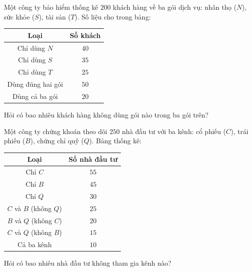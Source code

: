 \begin{bt}%
	Một công ty bảo hiểm thống kê $200$ khách hàng về ba gói dịch vụ: nhân thọ ($N$), sức khỏe ($S$), tài sản ($T$). Số liệu cho trong bảng:
	\begin{center}
		\begin{tabular}{|c|c|}
			\hline
			Loại & Số khách \\
			\hline
			Chỉ dùng $N$ & $40$ \\
			Chỉ dùng $S$ & $35$ \\
			Chỉ dùng $T$ & $25$ \\
			Dùng đúng hai gói & $50$ \\
			Dùng cả ba gói & $20$ \\
			\hline
		\end{tabular}
	\end{center}
	Hỏi có bao nhiêu khách hàng không dùng gói nào trong ba gói trên?
	
\end{bt}

\begin{bt}%
	Một công ty chứng khoán theo dõi $250$ nhà đầu tư với ba kênh: cổ phiếu ($C$), trái phiếu ($B$), chứng chỉ quỹ ($Q$). Bảng thống kê:
	\begin{center}
		\begin{tabular}{|c|c|}
			\hline
			Loại & Số nhà đầu tư \\
			\hline
			Chỉ $C$ & $55$ \\
			Chỉ $B$ & $45$ \\
			Chỉ $Q$ & $30$ \\
			$C$ và $B$ (không $Q$) & $25$ \\
			$B$ và $Q$ (không $C$) & $20$ \\
			$C$ và $Q$ (không $B$) & $15$ \\
			Cả ba kênh & $10$ \\
			\hline
		\end{tabular}
	\end{center}
	Hỏi có bao nhiêu nhà đầu tư không tham gia kênh nào?
	
\end{bt}

